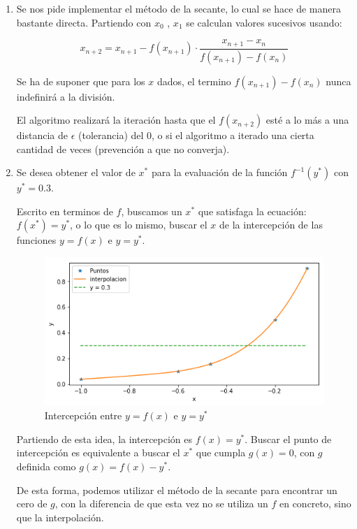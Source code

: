 \documentclass[spanish, fleqn]{article}
\begin{document}
\begin{enumerate}
  \item %
  Se nos pide implementar el método de la secante, lo cual se hace de manera bastante directa. Partiendo con $x_0$ , $x_1$ se calculan valores sucesivos usando:
  
  $$x_{n+2} = x_{n+1} - f(x_{n+1}) \cdot \frac{x_{n+1}-x_{n}}{f(x_{n+1}) - f(x_n)}$$ 
  
  Se ha de suponer que para los $x$ dados, el termino $f(x_{n+1}) - f(x_n)$ nunca indefinirá a la división.
  
  El algoritmo realizará la iteración hasta que  
  el $f(x_{n+2})$ esté a lo más a una distancia de $\epsilon$ (tolerancia) del 0, o si el algoritmo a iterado una cierta cantidad de veces (prevención a que no converja).
  
  \item %
	Se desea obtener el valor de $x^*$ para la evaluación de la función $f^{-1} (y^*)$ con $y^*=0.3$. 
	
	Escrito en terminos de $f$, buscamos un $x^*$ que satisfaga la ecuación: $f(x^*) = y^*$, o lo que es lo mismo, buscar el $x$ de la intercepción de las funciones $y = f(x)$ e $ y = y^*$.
	  
     \begin{figure}[h]
     \caption{Intercepción entre $y=f(x)$ e $y=y^*$}
    \centering 
 	\includegraphics[scale=0.6]{intercepcion.png}
   \end{figure}
	
	Partiendo de esta idea, la intercepción es $f(x) = y^*$. Buscar el punto de intercepción es equivalente a buscar el $x^*$ que cumpla $g(x) = 0$, con $g$ definida como $g(x) = f(x) - y^*$.
	
	De esta forma, podemos utilizar el método de la secante para encontrar un cero de $g$, con la diferencia de que esta vez no se utiliza un $f$ en concreto, sino que la interpolación.
  

\end{enumerate}
\end{document}
